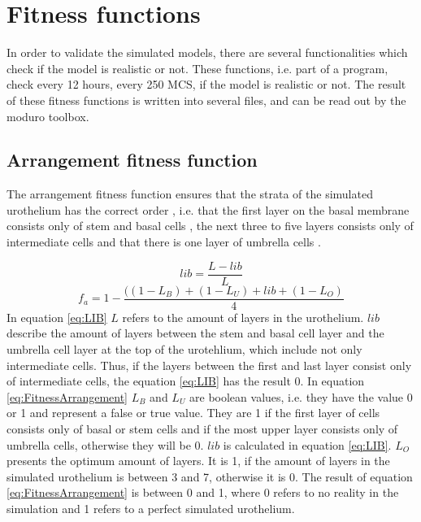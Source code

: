 \section{Fitness functions}\label{sec:fitnessFunctions}
In order to validate the simulated models, there are several functionalities which check if the model is realistic or not. These functions, i.e. part of a program, check every 12 hours, every 250 \ac{MCS}, if the model is realistic or not. The result of these fitness functions is written into several files, and can be read out by the moduro toolbox.

\subsection{Arrangement fitness function}
The arrangement fitness function ensures that the strata of the simulated urothelium has the correct order \cite{Torelli2017}, i.e. that the first layer on the basal membrane consists only of stem and basal cells \cite{REFS}, the next three to five layers consists only of intermediate cells \cite{REFS} and that there is one layer of umbrella cells \cite{REFS}.

\begin{equation}\label{eq:LIB}
lib = \dfrac{L - lib}{L}
\end{equation}
\begin{equation}\label{eq:FitnessArrangement} 
f_{a} = 1 - \dfrac{((1-L_{B})+(1-L_{U})+lib+(1-L_{O})}{4}
\end{equation}
In equation \ref{eq:LIB} $L$ refers to the amount of layers in the urothelium. $lib$ describe the amount of layers between the stem and basal cell layer and the umbrella cell layer at the top of the urotehlium, which include not only intermediate cells. Thus, if the layers between the first and last layer consist only of intermediate cells, the equation \ref{eq:LIB} has the result 0.\newline
In equation \ref{eq:FitnessArrangement} $L_{B}$ and $L_{U}$ are boolean values, i.e. they have the value 0 or 1 and represent a false or true value. They are 1 if the first layer of cells consists only of basal or stem cells and if the most upper layer consists only of umbrella cells, otherwise they will be 0.
$lib$ is calculated in equation \ref{eq:LIB}. $L_{O}$ presents the optimum amount of layers. It is 1, if the amount of layers in the simulated urothelium is between 3 and 7, otherwise it is 0. The result of equation \ref{eq:FitnessArrangement} is between 0 and 1, where 0 refers to no reality in the simulation and 1 refers to a perfect simulated urothelium. \newline

